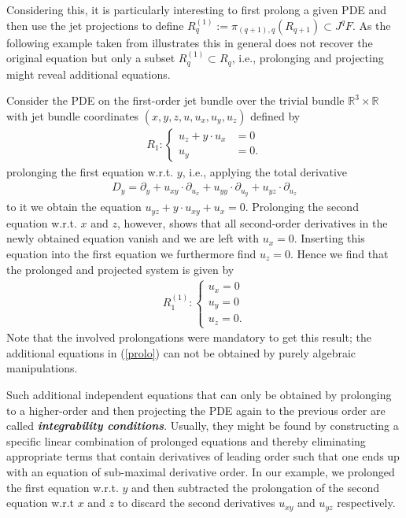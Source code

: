 Considering this, it is particularly interesting to first prolong a given PDE and then use the jet projections to define $R_q^{(1)} := \pi_{(q+1),q}\left ( R_{q+1} \right ) \subset J^qF $. As the following example taken from \cite{seiler1994analysis} illustrates this in general does not recover the original equation but only a subset $R_q^{(1)} \subset R_q$, i.e., prolonging and projecting might reveal additional equations.
\begin{example}\label{ExamplePDE}
Consider the PDE on the first-order jet bundle over the trivial bundle $\mathbb{R}^3 \times \mathbb{R}$ with jet bundle  coordinates $(x,y,z,u,u_x,u_y,u_z)$ defined by 
\begin{align}
    R_1 : \begin{cases} u_z + y \cdot u_x &= 0 \\
                        u_y &= 0.
            \end{cases}
\end{align}
prolonging the first equation w.r.t. $y$, i.e., applying the total derivative 
\begin{align}
D_y = \partial_y + u_{xy} \cdot \partial_{u_x} + u_{yy} \cdot \partial_{u_y} + u_{yz} \cdot \partial_{u_z}
\end{align}
to it we obtain the equation $u_{yz} + y \cdot u_{xy} + u_x =0$. Prolonging the second equation w.r.t. $x$ and $z$, however, shows that all second-order derivatives in the newly obtained equation vanish and we are left with $u_x = 0$. Inserting this equation into the first equation we furthermore find $u_z = 0$. Hence we find that the prolonged and projected system is given by 
\begin{align}\label{prolo}
    R_1^{(1)} : \begin{cases} u_x = 0 \\
                        u_y = 0\\
                        u_z = 0 .
            \end{cases}
\end{align}
Note that the involved prolongations were mandatory to get this result; the additional equations in (\ref{prolo})  can not be obtained by purely algebraic manipulations. 
\end{example}
Such additional independent equations that can only be obtained by prolonging to a higher-order and then projecting the PDE again to the previous order are called \textit{\textbf{integrability conditions}}. 
Usually, they might be found by constructing a specific linear combination of prolonged equations and thereby eliminating appropriate terms that contain derivatives of leading order such that one ends up with an equation of sub-maximal derivative order. In our example, we prolonged the first equation w.r.t. $y$ and then subtracted the prolongation of the second equation w.r.t $x$ and $z$ to discard the second derivatives $u_{xy}$ and $u_{yz}$ respectively. 

